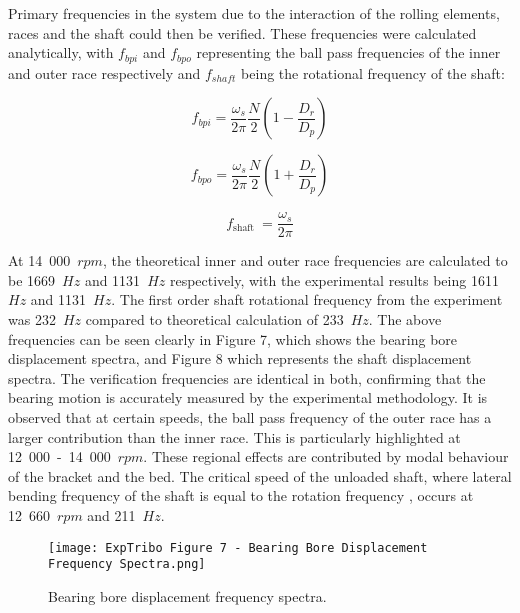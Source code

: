 Primary frequencies in the system due to the interaction of the rolling elements, races and the shaft could then be verified. These frequencies were calculated analytically, with $f_{bpi}$ and $f_{bpo}$ representing the ball pass frequencies of the inner and outer race respectively and $f_{shaft}$ being the rotational frequency of the shaft:

\begin{equation}\label{ball pass frequency inner}
	f_{b p i}=\frac{\omega_s}{2 \pi} \frac{N}{2}\left(1-\frac{D_r}{D_p}\right)
\end{equation}

\begin{equation}\label{ball pass frequency outer}
	f_{b p o}=\frac{\omega_s}{2 \pi} \frac{N}{2}\left(1+\frac{D_r}{D_p}\right)
\end{equation}

\begin{equation}\label{ball pass frequency shaft}
	f_{\text {shaft }}=\frac{\omega_s}{2 \pi}
\end{equation}

At 14~000~$rpm$, the theoretical inner and outer race frequencies are calculated to be 1669~$Hz$ and 1131~$Hz$ respectively, with the experimental results being 1611~$Hz$ and 1131~$Hz$. The first order shaft rotational frequency from the experiment was 232~$Hz$ compared to theoretical calculation of 233~$Hz$. The above frequencies can be seen clearly in Figure 7, which shows the bearing bore displacement spectra, and Figure 8 which represents the shaft displacement spectra. The verification frequencies are identical in both, confirming that the bearing motion is accurately measured by the experimental methodology. It is observed that at certain speeds, the ball pass frequency of the outer race has a larger contribution than the inner race. This is particularly highlighted at 12~000~-~14~000~$rpm$. These regional effects are contributed by modal behaviour of the bracket and the bed. The critical speed of the unloaded shaft, where lateral bending frequency of the shaft is equal to the rotation frequency \cite{Shigley'sMechanicalEngineeringDesign}, occurs at 12~660~$rpm$ and 211~$Hz$.

\begin{figure}
	\centering
	\texttt{[image: ExpTribo Figure 7 - Bearing Bore Displacement Frequency Spectra.png]}
	\caption{Bearing bore displacement frequency spectra.}
	\label{Bearing bore displacement frequency spectra}
\end{figure}

